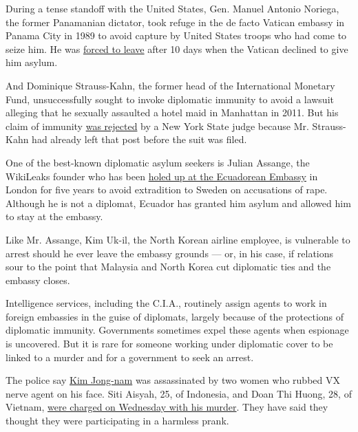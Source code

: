 During a tense standoff with the United States, Gen. Manuel Antonio
Noriega, the former Panamanian dictator, took refuge in the de facto
Vatican embassy in Panama City in 1989 to avoid capture by United States
troops who had come to seize him. He was
\href{http://www.nytimes3xbfgragh.onion/1990/01/05/world/noriega-s-surrender-chronology-vatican-issues-ultimatum-general-takes-walk.html?pagewanted=all.}{forced
to leave} after 10 days when the Vatican declined to give him asylum.

And Dominique Strauss-Kahn, the former head of the International
Monetary Fund, unsuccessfully sought to invoke diplomatic immunity to
avoid a lawsuit alleging that he sexually assaulted a hotel maid in
Manhattan in 2011. But his claim of immunity
\href{http://www.nytimes3xbfgragh.onion/2012/05/02/nyregion/strauss-kahns-claim-of-diplomatic-immunity-is-rejected.html}{was
rejected} by a New York State judge because Mr. Strauss-Kahn had already
left that post before the suit was filed.

One of the best-known diplomatic asylum seekers is Julian Assange, the
WikiLeaks founder who has been
\href{https://www.nytimes3xbfgragh.onion/2017/02/17/world/europe/julian-assange-ecuador-embassy.html}{holed
up at the Ecuadorean Embassy} in London for five years to avoid
extradition to Sweden on accusations of rape. Although he is not a
diplomat, Ecuador has granted him asylum and allowed him to stay at the
embassy.

Like Mr. Assange, Kim Uk-il, the North Korean airline employee, is
vulnerable to arrest should he ever leave the embassy grounds --- or, in
his case, if relations sour to the point that Malaysia and North Korea
cut diplomatic ties and the embassy closes.

Intelligence services, including the C.I.A., routinely assign agents to
work in foreign embassies in the guise of diplomats, largely because of
the protections of diplomatic immunity. Governments sometimes expel
these agents when espionage is uncovered. But it is rare for someone
working under diplomatic cover to be linked to a murder and for a
government to seek an arrest.

The police say
\href{https://www.nytimes3xbfgragh.onion/2017/02/15/world/asia/kim-jong-nam-assassination-north-korea.html}{Kim
Jong-nam} was assassinated by two women who rubbed VX nerve agent on his
face. Siti Aisyah, 25, of Indonesia, and Doan Thi Huong, 28, of Vietnam,
\href{https://www.nytimes3xbfgragh.onion/2017/02/28/world/asia/north-korea-kim-jong-nam-death.html}{were
charged on Wednesday with his murder}. They have said they thought they
were participating in a harmless prank.

